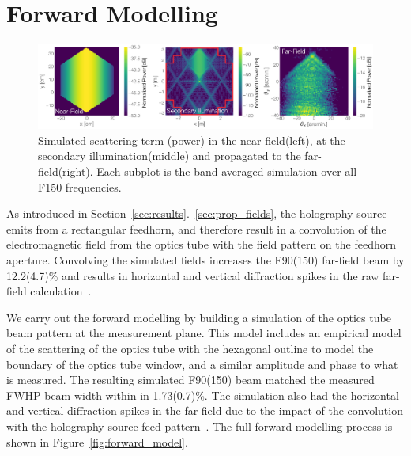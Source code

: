 \section{Forward Modelling}
\label{sec:forward_model}
\begin{figure}[t]
    \centering
    \includegraphics[width = .95\textwidth]{Figures/scatter_model.pdf}
    \caption{Simulated scattering term (power) in the near-field(left), at the secondary illumination(middle) and propagated to the far-field(right).  Each subplot is the band-averaged simulation over all F150 frequencies.}
    \label{fig:scattering_forward}
\end{figure}
As introduced in Section~\ref{sec:results}.~\ref{sec:prop_fields}, the holography source emits from a rectangular feedhorn, and therefore result in a convolution of the electromagnetic field from the optics tube with the field pattern on the feedhorn aperture.  Convolving the simulated fields increases the F90(150) far-field beam by 12.2(4.7)\% and results in horizontal and vertical diffraction spikes in the raw far-field calculation~\cite{Goodman2005-ne}.

We carry out the forward modelling by building a simulation of the optics tube beam pattern at the measurement plane.  This model includes an empirical model of the scattering of the optics tube with the hexagonal outline to model the boundary of the optics tube window, and a similar amplitude and phase to what is measured.  The resulting simulated F90(150) beam matched the measured FWHP beam width within in 1.73(0.7)\%.  The simulation also had the horizontal and vertical diffraction spikes in the far-field due to the impact of the convolution with the holography source feed pattern~\cite{Goodman2005-ne}.  The full forward modelling process is shown in Figure~\ref{fig:forward_model}.

